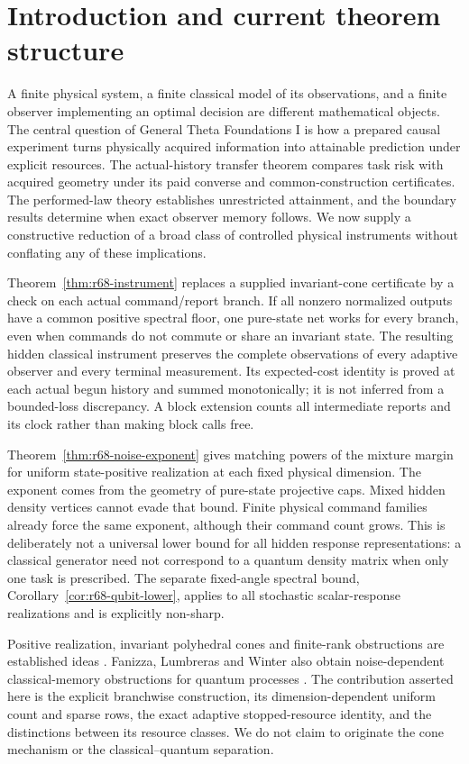 \section{Introduction and current theorem structure}\label{sec:current-overview}\label{sec:introduction}
A finite physical system, a finite classical model of its observations, and a finite observer implementing an optimal decision are different mathematical objects. The central question of General Theta Foundations I is how a prepared causal experiment turns physically acquired information into attainable prediction under explicit resources. The actual-history transfer theorem compares task risk with acquired geometry under its paid converse and common-construction certificates. The performed-law theory establishes unrestricted attainment, and the boundary results determine when exact observer memory follows. We now supply a constructive reduction of a broad class of controlled physical instruments without conflating any of these implications.

Theorem~\ref{thm:r68-instrument} replaces a supplied invariant-cone certificate by a check on each actual command/report branch. If all nonzero normalized outputs have a common positive spectral floor, one pure-state net works for every branch, even when commands do not commute or share an invariant state. The resulting hidden classical instrument preserves the complete observations of every adaptive observer and every terminal measurement. Its expected-cost identity is proved at each actual begun history and summed monotonically; it is not inferred from a bounded-loss discrepancy. A block extension counts all intermediate reports and its clock rather than making block calls free.

Theorem~\ref{thm:r68-noise-exponent} gives matching powers of the mixture margin for uniform state-positive realization at each fixed physical dimension. The exponent comes from the geometry of pure-state projective caps. Mixed hidden density vertices cannot evade that bound. Finite physical command families already force the same exponent, although their command count grows. This is deliberately not a universal lower bound for all hidden response representations: a classical generator need not correspond to a quantum density matrix when only one task is prescribed. The separate fixed-angle spectral bound, Corollary~\ref{cor:r68-qubit-lower}, applies to all stochastic scalar-response realizations and is explicitly non-sharp.

Positive realization, invariant polyhedral cones and finite-rank obstructions are established ideas \cite{Heller65,CarlylePaz71,MonrasWinter14}. Fanizza, Lumbreras and Winter also obtain noise-dependent classical-memory obstructions for quantum processes \cite{Fanizza24}. The contribution asserted here is the explicit branchwise construction, its dimension-dependent uniform count and sparse rows, the exact adaptive stopped-resource identity, and the distinctions between its resource classes. We do not claim to originate the cone mechanism or the classical--quantum separation.

